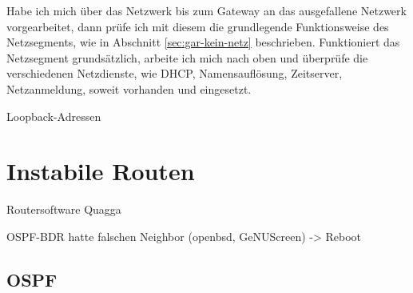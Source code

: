 \begin{normaltext}
  Habe ich mich über das Netzwerk bis zum Gateway an das ausgefallene Netzwerk
  vorgearbeitet, dann prüfe ich mit diesem die grundlegende Funktionsweise des
  Netzsegments, wie in Abschnitt \ref{sec:gar-kein-netz} beschrieben.
  Funktioniert das Netzsegment grundsätzlich, arbeite ich mich  nach oben und
  überprüfe die verschiedenen Netzdienste, wie DHCP, Namensauflösung,
  Zeitserver, Netzanmeldung, soweit vorhanden und eingesetzt.

  \begin{Exkursbox}{Loopback-Adressen}
  \end{Exkursbox}
\end{normaltext}

\section{Instabile Routen}
\label{sec:instabile-routen}

\begin{notes}
\item Routersoftware Quagga
\item OSPF-BDR hatte falschen Neighbor (openbsd, GeNUScreen) -> Reboot
\end{notes}


\subsection{OSPF}
\label{sec:ospf}

